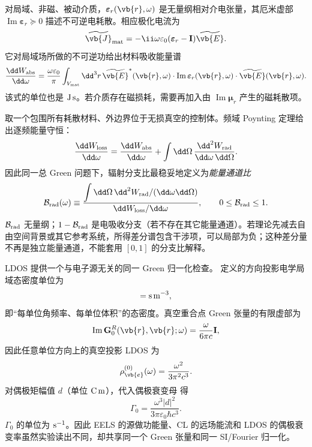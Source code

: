 对局域、非磁、被动介质，$\boldsymbol\varepsilon_r(\vb{r},\omega)$ 是无量纲相对介电张量，其厄米虚部 $\operatorname{Im}\boldsymbol\varepsilon_r\succeq0$ 描述不可逆电耗散。相应极化电流为
\begin{equation}
{
\widetilde{\vb{J}}_{\rm mat}
=-\ii\omega\varepsilon_0(\boldsymbol\varepsilon_r-\mathbf I)
\widetilde{\vb{E}}.}
\label{eq:material_polarization_current_dp68}
\end{equation}
它对局域场所做的不可逆功给出材料吸收能量谱
\begin{equation}
{
\frac{\dd W_{\rm abs}}{\dd\omega}
=
\frac{\omega\varepsilon_0}{\pi}
\int_{V_{\rm mat}}\dd^3 r\,
\widetilde{\vb{E}}^{*}(\vb{r},\omega)\cdot
\operatorname{Im}\boldsymbol\varepsilon_r(\vb{r},\omega)
\cdot\widetilde{\vb{E}}(\vb{r},\omega).}
\label{eq:material_absorbed_energy_spectrum_si}
\end{equation}
该式的单位也是 ${\rm J\,s}$。若介质存在磁损耗，需要再加入由 $\operatorname{Im}\boldsymbol\mu_r$ 产生的磁耗散项。

取一个包围所有耗散材料、外边界位于无损真空的控制体。频域 Poynting 定理给出逐频能量守恒：
\begin{equation}
{
\frac{\dd W_{\rm loss}}{\dd\omega}
=
\frac{\dd W_{\rm abs}}{\dd\omega}
+
\int\dd\Omega\,
\frac{\dd^2 W_{\rm rad}}{\dd\omega\,\dd\Omega}.}
\label{eq:eels_radiative_absorptive_energy_balance}
\end{equation}
因此同一总 Green 问题下，辐射分支比最稳妥地定义为\emph{能量通道比}
\begin{equation}
{
\mathcal B_{\rm rad}(\omega)
\equiv
\frac{\displaystyle
\int\dd\Omega\,
\dd^2 W_{\rm rad}/(\dd\omega\dd\Omega)}
{\displaystyle\dd W_{\rm loss}/\dd\omega},
\qquad
0\le\mathcal B_{\rm rad}\le1.}
\label{eq:radiative_branching_ratio_eels_cl}
\end{equation}
$\mathcal B_{\rm rad}$ 无量纲；$1-\mathcal B_{\rm rad}$ 是电吸收分支（若不存在其它能量通道）。若理论先减去自由空间背景或其它参考系统，所得差分谱包含干涉项，可以局部为负；这种差分量不再是独立能量通道，不能套用 $[0,1]$ 的分支比解释。

LDOS 提供一个与电子源无关的同一 Green 归一化检查。 定义的方向投影电学局域态密度单位为
\begin{equation*}
[\rho_{\vb{e}_d}]={\rm s\,m^{-3}},
\end{equation*}
即“每单位角频率、每单位体积”的态密度。真空重合点 Green 张量的有限虚部为
\begin{equation*}
\operatorname{Im}\mathbf G_0^R(\vb{r},\vb{r};\omega)
=\frac{\omega}{6\pi c}\mathbf I,
\end{equation*}
因此任意单位方向上的真空投影 LDOS 为
\begin{equation*}
\rho_{\vb{e}}^{(0)}(\omega)
=\frac{\omega^2}{3\pi^2c^3}.
\end{equation*}
对偶极矩幅值 $d$（单位 ${\rm C\,m}$），代入偶极衰变母 得
\begin{equation}
{
\Gamma_0
=\frac{\omega^3|d|^2}
{3\pi\varepsilon_0\hbar c^3}.}
\label{eq:vacuum_dipole_decay_ldos_check}
\end{equation}
$\Gamma_0$ 的单位为 ${\rm s^{-1}}$。因此 EELS 的源做功能量、CL 的远场能流和 LDOS 的偶极衰变率虽然实验读出不同，却共享同一个 Green 张量和同一 SI/Fourier 归一化。
